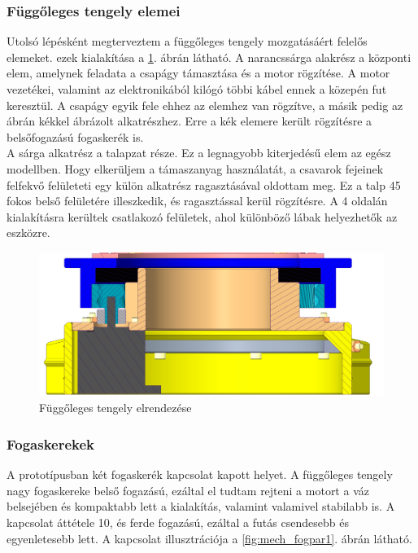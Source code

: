 \documentclass[12pt,a4paper]{article}
\begin{document}
\subsubsection{Függőleges tengely elemei}

Utolsó lépésként megterveztem a függőleges tengely mozgatásáért felelős elemeket. ezek kialakítása a \ref{fig:mech_alsoreszek}. ábrán látható. A narancssárga alakrész a központi elem, amelynek feladata a csapágy támasztása és a motor rögzítése. A motor vezetékei, valamint az elektronikából kilógó többi kábel ennek a közepén fut keresztül. A csapágy egyik fele ehhez az elemhez van rögzítve, a másik pedig  az ábrán kékkel ábrázolt alkatrészhez. Erre a kék elemere került rögzítésre a belsőfogazású fogaskerék is. \\ 

A sárga alkatrész a talapzat része. Ez a legnagyobb kiterjedésű elem az egész modellben. Hogy elkerüljem a támaszanyag használatát, a csavarok fejeinek felfekvő felületeti egy külön alkatrész ragasztásával oldottam meg. Ez a talp 45 fokos belső felületére illeszkedik, és ragasztással kerül rögzítésre. A 4 oldalán kialakításra kerültek csatlakozó felületek, ahol különböző lábak helyezhetők az eszközre.

\begin{figure}[h!]
	\centering
	\includegraphics[width=1\linewidth]{mech_alsoreszek}
	\caption{Függőleges tengely elrendezése}
	\label{fig:mech_alsoreszek}
\end{figure}

\subsubsection{Fogaskerekek}
A prototípusban két fogaskerék kapcsolat kapott helyet. A függőleges tengely nagy fogaskereke belső fogazású, ezáltal el tudtam rejteni a motort a váz belsejében és kompaktabb lett a kialakítás, valamint valamivel stabilabb is. A kapcsolat áttétele 10, és ferde fogazású, ezáltal a futás csendesebb és egyenletesebb lett. A kapcsolat illusztrációja a \ref{fig:mech_fogpar1}. ábrán látható.
\end{document}
